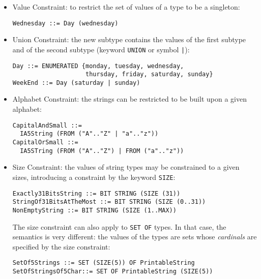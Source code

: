 \documentclass[12pt]{article}
\begin{document}
\begin{slide}
\begin{itemize}
\pagebreak

  \item \textsf{Value Constraint}: to restrict the set of values of a
        type to be a singleton:

\begin{verbatim}
Wednesday ::= Day (wednesday)
\end{verbatim}

  \item \textsf{Union Constraint}: the new subtype contains the
        values of the first subtype and of the second subtype (keyword
        \texttt{UNION} or symbol \texttt{|}):

\begin{verbatim}
Day ::= ENUMERATED {monday, tuesday, wednesday, 
                    thursday, friday, saturday, sunday}
WeekEnd ::= Day (saturday | sunday)
\end{verbatim}

  \item \textsf{Alphabet Constraint}: the strings can be restricted to
        be built upon a given alphabet:

\begin{verbatim}
CapitalAndSmall ::= 
  IA5String (FROM ("A".."Z" | "a".."z"))
CapitalOrSmall ::= 
  IA5STring (FROM ("A".."Z") | FROM ("a".."z"))
\end{verbatim}

\pagebreak

  \item \textsf{Size Constraint}: the values of string types may be
        constrained to a given sizes, introducing a constraint by the
        keyword \texttt{SIZE}:

\begin{verbatim}
Exactly31BitsString ::= BIT STRING (SIZE (31))
StringOf31BitsAtTheMost ::= BIT STRING (SIZE (0..31))
NonEmptyString ::= BIT STRING (SIZE (1..MAX))
\end{verbatim}

The size constraint can also apply to \texttt{SET OF} types. In that
case, the semantics is very different: the values of the types are
sets whose \emph{cardinals} are specified by the size constraint:

\begin{verbatim}
SetOf5Strings ::= SET (SIZE(5)) OF PrintableString
SetOfStringsOf5Char::= SET OF PrintableString (SIZE(5))
\end{verbatim}

\pagebreak


\end{itemize}
\end{slide}
\end{document}

